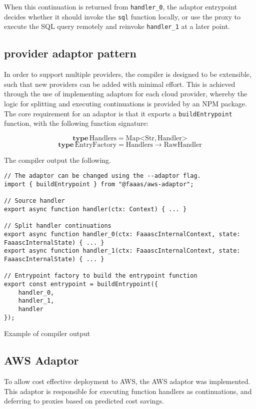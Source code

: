 When this continuation is returned from \verb|handler_0|, the adaptor entrypoint decides whether it should invoke the \verb|sql| function locally, or use the proxy to execute the SQL query remotely and reinvoke \verb|handler_1| at a later point.

\subsection{\faas{} provider adaptor pattern}
In order to support multiple \faas{} providers, the \faaasc{} compiler is designed to be extensible, such that new providers can be added with minimal effort. This is achieved through the use of implementing adaptors for each cloud provider, whereby the logic for splitting and executing continuations is provided by an NPM package. The core requirement for an adaptor is that it exports a \verb|buildEntrypoint| function, with the following function signature:

\begin{signature}
$$\textbf{type}\, \textrm{Handlers} = \textrm{Map}\mathord{<}\textrm{Str}, \textrm{Handler}\mathord{>}$$
$$\textbf{type}\, \textrm{EntryFactory} = \textrm{Handlers} \rightarrow \textrm{RawHandler}$$
\end{signature}

The \faaasc{} compiler output the following.

\begin{listing}[H]
\begin{verbatim}
// The adaptor can be changed using the --adaptor flag.
import { buildEntrypoint } from "@faaas/aws-adaptor";

// Source handler
export async function handler(ctx: Context) { ... }

// Split handler continuations
export async function handler_0(ctx: FaaascInternalContext, state: FaaascInternalState) { ... }
export async function handler_1(ctx: FaaascInternalContext, state: FaaascInternalState) { ... }

// Entrypoint factory to build the entrypoint function
export const entrypoint = buildEntrypoint({
    handler_0,
    handler_1,
    handler
});
\end{verbatim}
\caption{Example of \faaasc{} compiler output}
\label{listing:faaasc-compiler-adaptor-output}
\end{listing}

\subsection{AWS Adaptor}
To allow cost effective deployment to AWS, the \faaasc{} AWS adaptor was implemented. This adaptor is responsible for executing function handlers as continuations, and deferring to proxies based on predicted cost savings.


